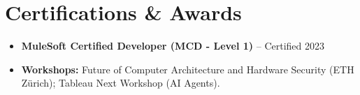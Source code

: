 \documentclass[letterpaper,10pt]{article}
\begin{document}
\section*{Certifications \& Awards}
\begin{itemize} \itemsep -2pt
    \item \textbf{MuleSoft Certified Developer (MCD - Level 1)} -- Certified 2023
    \item \textbf{Workshops:} Future of Computer Architecture and Hardware Security (ETH Zürich); Tableau Next Workshop (AI Agents).
\end{itemize}
\end{document}
